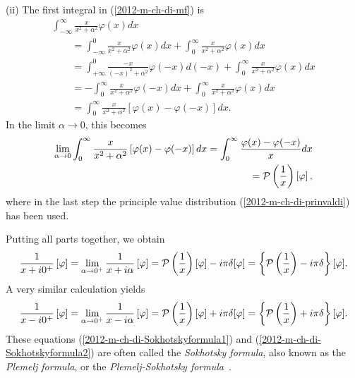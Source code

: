 (ii)
The first integral in (\ref{2012-m-ch-di-mf}) is
\begin{equation}
\begin{split}
\int_{-\infty}^\infty   \frac{x}{x^2+ \alpha^2}   \varphi(x) dx
\\
\qquad
=
\int_{-\infty}^0   \frac{x}{x^2+ \alpha^2}   \varphi(x) dx
+
\int_{0}^\infty   \frac{x}{x^2+ \alpha^2}   \varphi(x) dx
\\
\qquad
=
\int_{+\infty}^0   \frac{-x}{(-x)^2+ \alpha^2}   \varphi(-x) d(-x)
+
\int_{0}^\infty   \frac{x}{x^2+ \alpha^2}   \varphi(x) dx
\\
\qquad
=
-\int_{0}^\infty   \frac{ x}{x^2+ \alpha^2}   \varphi(-x) dx
+
\int_{0}^\infty   \frac{x}{x^2+ \alpha^2}   \varphi(x) dx
\\
\qquad
=
 \int_{0}^\infty   \frac{ x}{x^2+ \alpha^2} \left[  \varphi(x) - \varphi(-x) \right] dx
.
\end{split}
\end{equation}
In the limit $\alpha  \rightarrow 0$, this becomes
\begin{equation}
\begin{split}
\lim_{\alpha  \rightarrow 0} \int_{0}^\infty   \frac{ x}{x^2+ \alpha^2} \left[  \varphi(x) - \varphi(-x) \right] dx
=
\int_{0}^\infty   \frac{ \varphi(x) - \varphi(-x) }{x} dx
\\
\qquad =
{\cal P} \left(\frac{1}{x}\right) \left[\varphi\right]
,
\end{split}
\end{equation}
where in the last step the principle value distribution (\ref{2012-m-ch-di-prinvaldi})
has been used.

Putting all parts together, we obtain
\begin{equation}
\frac{1}{x+i0^+} \left[ \varphi \right]
= \lim_{\alpha  \rightarrow 0^+}\frac{1}{x+i\alpha} \left[ \varphi \right]
=  {\cal P} \left(\frac{1}{x}\right) \left[\varphi\right]
-i \pi \delta [\varphi ] = \left\{
{\cal P} \left(\frac{1}{x}\right) -i \pi \delta
\right\}  [\varphi ].
\label{2012-m-ch-di-Sokhotskyformula1}
\end{equation}
A very similar calculation yields
\begin{equation}
\frac{1}{x-i0^+} \left[ \varphi \right]
=
\lim_{\alpha  \rightarrow 0^+}\frac{1}{x-i\alpha} \left[ \varphi \right]
=  {\cal P} \left(\frac{1}{x}\right) \left[\varphi\right]
+i \pi \delta [\varphi ] = \left\{
{\cal P} \left(\frac{1}{x}\right) +i \pi \delta
\right\}  [\varphi ].
\label{2012-m-ch-di-Sokhotskyformula2}
\end{equation}
These equations
(\ref{2012-m-ch-di-Sokhotskyformula1})
and
(\ref{2012-m-ch-di-Sokhotskyformula2})
are often called the
{\em Sokhotsky  formula}, also known as the {\em Plemelj  formula}, or the {\em Plemelj-Sokhotsky formula}~\cite[-20mm]{Sokhotski-1873,Plemelj1908}.




